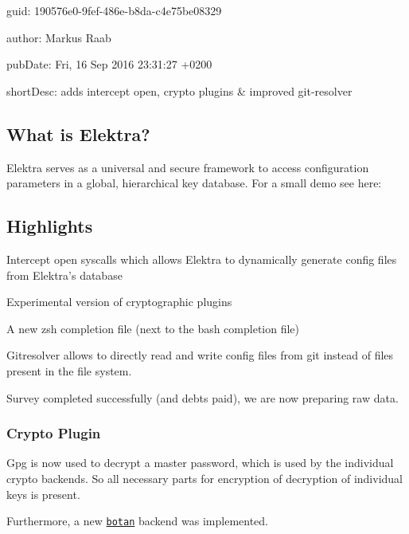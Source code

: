 
\begin{DoxyItemize}
\item guid\+: 190576e0-\/9fef-\/486e-\/b8da-\/c4e75be08329
\item author\+: Markus Raab
\item pub\+Date\+: Fri, 16 Sep 2016 23\+:31\+:27 +0200
\item short\+Desc\+: adds intercept open, crypto plugins \& improved git-\/resolver
\end{DoxyItemize}

\subsection*{What is Elektra?}

Elektra serves as a universal and secure framework to access configuration parameters in a global, hierarchical key database. For a small demo see here\+:

\href{https://asciinema.org/a/cantr04assr4jkv8v34uz9b8r}{\tt }

\subsection*{Highlights}


\begin{DoxyItemize}
\item Intercept open syscalls which allows Elektra to dynamically generate config files from Elektra’s database
\item Experimental version of cryptographic plugins
\item A new zsh completion file (next to the bash completion file)
\item Gitresolver allows to directly read and write config files from git instead of files present in the file system.
\item Survey completed successfully (and debts paid), we are now preparing raw data.
\end{DoxyItemize}

\subsubsection*{Crypto Plugin}

Gpg is now used to decrypt a master password, which is used by the individual crypto backends. So all necessary parts for encryption of decryption of individual keys is present.

Furthermore, a new \href{https://botan.randombit.net}{\tt botan} backend was implemented.

